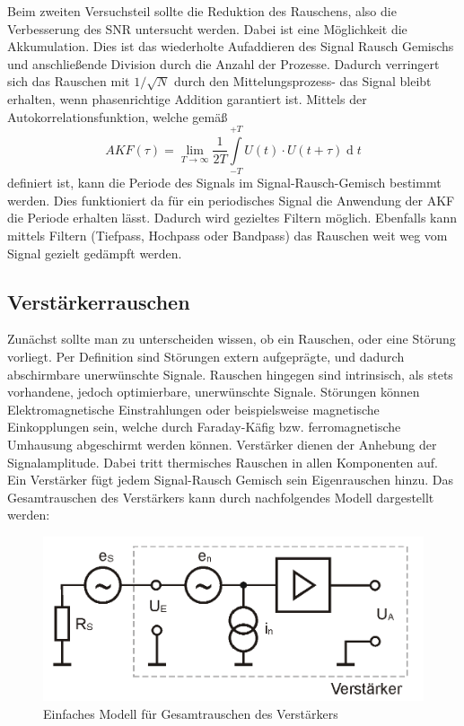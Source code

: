 \documentclass{article}						%
\begin{document}
		\newline
		Beim zweiten Versuchsteil sollte die Reduktion des Rauschens, also die Verbesserung des SNR untersucht werden. Dabei ist eine Möglichkeit die Akkumulation. Dies ist das wiederholte Aufaddieren des Signal Rausch Gemischs und anschließende Division durch die Anzahl der Prozesse. 
		Dadurch verringert sich das Rauschen mit $1/\sqrt{N}$ durch den Mittelungsprozess- das Signal bleibt erhalten, wenn phasenrichtige Addition garantiert ist.
		Mittels der Autokorrelationsfunktion, welche gemäß 
		\begin{equation}
			AKF(\tau)=\lim_{T \rightarrow \infty} \frac{1}{2T} \int \limits_{-T}^{+T} U(t) \cdot U(t+\tau) \operatorname{d}t
		\end{equation}
		definiert ist, kann die Periode des Signals im Signal-Rausch-Gemisch bestimmt werden. Dies funktioniert da für ein periodisches Signal die Anwendung der AKF die Periode erhalten lässt. Dadurch wird gezieltes Filtern möglich.
		Ebenfalls kann mittels Filtern (Tiefpass, Hochpass oder Bandpass) das Rauschen weit weg vom Signal gezielt gedämpft werden.
		
	\subsection{Verstärkerrauschen}
		Zunächst sollte man zu unterscheiden wissen, ob ein Rauschen, oder eine Störung vorliegt. Per Definition sind Störungen extern aufgeprägte, und dadurch abschirmbare unerwünschte Signale.
		Rauschen hingegen sind intrinsisch, als stets vorhandene, jedoch optimierbare, unerwünschte Signale.
		Störungen können Elektromagnetische Einstrahlungen oder beispielsweise magnetische Einkopplungen sein, welche durch Faraday-Käfig bzw. ferromagnetische Umhausung abgeschirmt werden können.
		\newline
		 Verstärker dienen der Anhebung der Signalamplitude. Dabei tritt thermisches Rauschen in allen Komponenten auf. Ein Verstärker fügt jedem Signal-Rausch Gemisch sein Eigenrauschen hinzu.
		 Das Gesamtrauschen des Verstärkers kann durch nachfolgendes Modell dargestellt werden:
		 \begin{figure}[h!]
		 	\centering
		 	\includegraphics[scale=0.5]{GrundlagenVerstaerkermodell}
		 	\caption{Einfaches Modell für Gesamtrauschen des Verstärkers}
		 \end{figure}
		 
\end{document}
